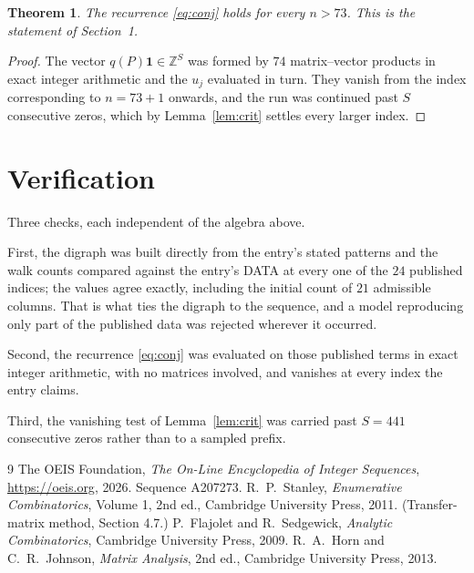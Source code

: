 \documentclass[11pt,a4paper]{article}
\theoremstyle{plain}
\newtheorem{theorem}{Theorem}
\theoremstyle{definition}
\begin{document}
\begin{theorem}
The recurrence \eqref{eq:conj} holds for every $n>73$. This is the statement of
Section~1.
\end{theorem}

\begin{proof}
The vector $q(P)\mathbf{1}\in\mathbb{Z}^{S}$ was formed by $74$ matrix--vector
products in exact integer arithmetic and the $u_j$ evaluated in turn. They vanish from the
index corresponding to $n=73+1$ onwards, and the run was continued past $S$ consecutive
zeros, which by Lemma~\ref{lem:crit} settles every larger index.
\end{proof}

\section{Verification}

Three checks, each independent of the algebra above.

First, the digraph was built directly from the entry's stated patterns and the walk counts
compared against the entry's DATA at every one of the $24$ published indices; the
values agree exactly, including the initial count of $21$ admissible columns. That is
what ties the digraph to the sequence, and a model reproducing only part of the published
data was rejected wherever it occurred.

Second, the recurrence \eqref{eq:conj} was evaluated on those published terms in exact
integer arithmetic, with no matrices involved, and vanishes at every index the entry claims.

Third, the vanishing test of Lemma~\ref{lem:crit} was carried past $S=441$ consecutive
zeros rather than to a sampled prefix.

\begin{thebibliography}{9}
 The OEIS Foundation, \emph{The On-Line Encyclopedia of Integer
Sequences}, \url{https://oeis.org}, 2026. Sequence A207273.
 R.~P.~Stanley, \emph{Enumerative Combinatorics}, Volume 1, 2nd ed.,
Cambridge University Press, 2011. (Transfer-matrix method, Section 4.7.)
 P.~Flajolet and R.~Sedgewick, \emph{Analytic Combinatorics}, Cambridge
University Press, 2009.
 R.~A.~Horn and C.~R.~Johnson, \emph{Matrix Analysis}, 2nd ed., Cambridge
University Press, 2013.
\end{thebibliography}
\end{document}
